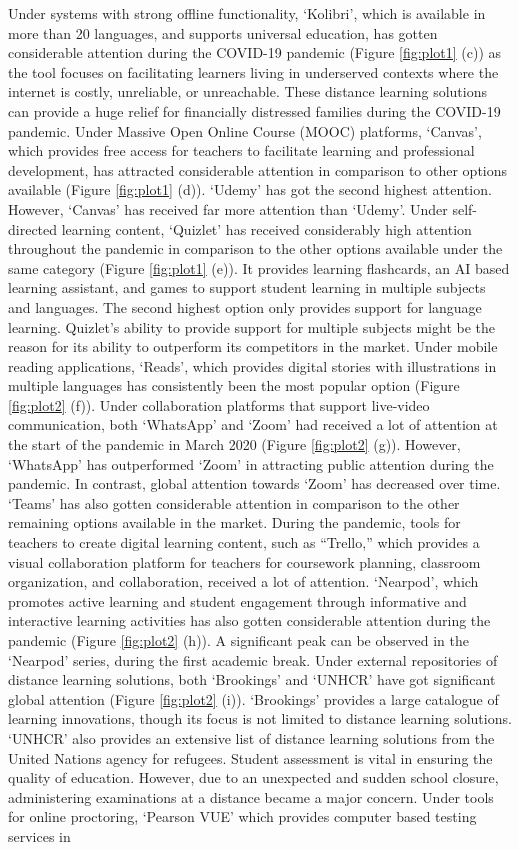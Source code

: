 \documentclass[11pt,a4paper,]{article}
\begin{document}
Under systems with strong offline functionality, `Kolibri', which is available in more than 20 languages, and supports universal education, has gotten considerable attention during the COVID-19 pandemic (Figure \ref{fig:plot1} (c)) as the tool focuses on facilitating learners living in underserved contexts where the internet is costly, unreliable, or unreachable. These distance learning solutions can provide a huge relief for financially distressed families during the COVID-19 pandemic. Under Massive Open Online Course (MOOC) platforms, `Canvas', which provides free access for teachers to facilitate learning and professional development, has attracted considerable attention in comparison to other options available (Figure \ref{fig:plot1} (d)). `Udemy' has got the second highest attention. However, `Canvas' has received far more attention than `Udemy'. Under self-directed learning content, `Quizlet' has received considerably high attention throughout the pandemic in comparison to the other options available under the same category (Figure \ref{fig:plot1} (e)). It provides learning flashcards, an AI based learning assistant, and games to support student learning in multiple subjects and languages. The second highest option only provides support for language learning. Quizlet's ability to provide support for multiple subjects might be the reason for its ability to outperform its competitors in the market. Under mobile reading applications, `Reads', which provides digital stories with illustrations in multiple languages has consistently been the most popular option (Figure \ref{fig:plot2} (f)). Under collaboration platforms that support live-video communication, both `WhatsApp' and `Zoom' had received a lot of attention at the start of the pandemic in March 2020 (Figure \ref{fig:plot2} (g)). However, `WhatsApp' has outperformed `Zoom' in attracting public attention during the pandemic. In contrast, global attention towards `Zoom' has decreased over time. `Teams' has also gotten considerable attention in comparison to the other remaining options available in the market. During the pandemic, tools for teachers to create digital learning content, such as ``Trello,'' which provides a visual collaboration platform for teachers for coursework planning, classroom organization, and collaboration, received a lot of attention. `Nearpod', which promotes active learning and student engagement through informative and interactive learning activities has also gotten considerable attention during the pandemic (Figure \ref{fig:plot2} (h)). A significant peak can be observed in the `Nearpod' series, during the first academic break. Under external repositories of distance learning solutions, both `Brookings' and `UNHCR' have got significant global attention (Figure \ref{fig:plot2} (i)). `Brookings' provides a large catalogue of learning innovations, though its focus is not limited to distance learning solutions. `UNHCR' also provides an extensive list of distance learning solutions from the United Nations agency for refugees. Student assessment is vital in ensuring the quality of education. However, due to an unexpected and sudden school closure, administering examinations at a distance became a major concern. Under tools for online proctoring, `Pearson VUE' which provides computer based testing services in
\end{document}
